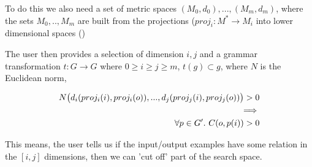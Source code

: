 To do this we also need a set of metric spaces $(M_0,d_0),...,(M_m,d_m)$, where the sets $M_0,..,M_m$ are built from the projections ($proj_i:M^{*} \to M_i$ into lower dimensional spaces ()

The user then provides a selection of dimension $i,j$  and a grammar transformation $t:G \to G$ where $0 \geq i \geq j \geq m$, $t(g) \subset g$, where $N$ is the Euclidean norm,

\begin{align*}
  N\big{(} d_i(proj_i(i),proj_i(o)) ,..., d_j(proj_j(i),proj_j(o)) \big{)} > 0 \\
\implies \\
\forall p \in G'.\ C(o,p(i)) > 0 \\
\end{align*}

This means, the user tells us if the input/output examples have some relation in the $[i,j]$ dimensions, then we can 'cut off' part of the search space.


